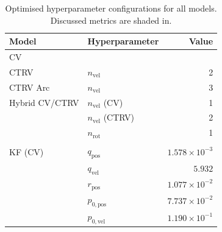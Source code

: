 \begin{table}[t]
\centering
\caption[Exp. I Optimised hyperparameter configurations]{Optimised hyperparameter configurations for all models. Discussed metrics are shaded in.}
\label{tab:hpo_results_exp0}
\begin{tabular}{llr}
\toprule
\textbf{Model} & \textbf{Hyperparameter} & \textbf{Value} \\
\midrule
CV
  & \cellcolor{blue!15}{$n_\text{vel}$}           & \cellcolor{blue!15}{1} \\
CTRV
  & $n_\text{vel}$            & 2 \\
CTRV Arc
  & $n_\text{vel}$            & 3 \\
Hybrid CV/CTRV
  & $n_\text{vel}$ (CV)       & 1 \\
  & $n_\text{vel}$ (CTRV)     & 2 \\
  & $n_\text{rot}$            & 1 \\
  & \cellcolor{blue!15}{$\tau_\text{rot}$ }       & \cellcolor{blue!15}{29.28 °/min} \\
\midrule
KF (CV)
  & \cellcolor{cyan!15}$q_\text{pos}$ & \cellcolor{cyan!15}$1.578 \times 10^{-3}$ \\
  & $q_\text{vel}$                    & $5.932$ \\
  & \cellcolor{cyan!15}$r_\text{pos}$ & \cellcolor{cyan!15}$1.077 \times 10^{-2}$ \\
  & $p_{0,\text{pos}}$                & $7.737 \times 10^{-2}$ \\
  & $p_{0,\text{vel}}$                & $1.190 \times 10^{-1}$ \\



\end{tabular}
\end{table}
